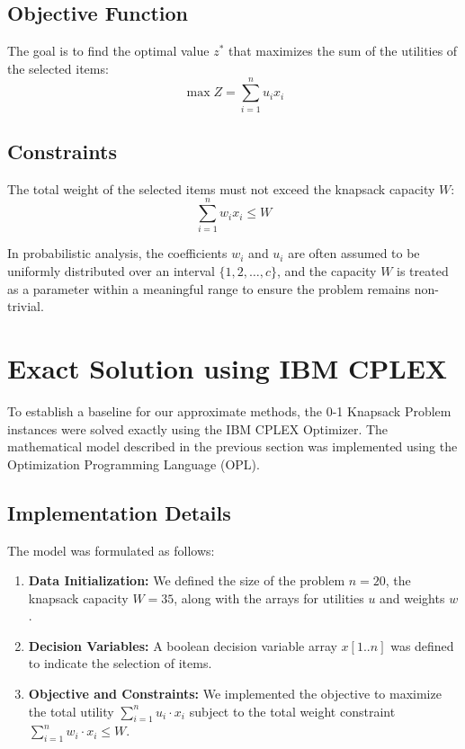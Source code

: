 \documentclass[11pt,a4paper]{article}
\begin{document}
\subsection*{Objective Function}
The goal is to find the optimal value $z^*$ that maximizes the sum of the utilities of the selected items:
\begin{equation*}
    \max Z = \sum_{i=1}^{n} u_i x_i
\end{equation*}

\subsection*{Constraints}
The total weight of the selected items must not exceed the knapsack capacity $W$:
\begin{equation*}
    \sum_{i=1}^{n} w_i x_i \le W
\end{equation*}

In probabilistic analysis, the coefficients $w_i$ and $u_i$ are often assumed to be uniformly distributed over an interval $\{1, 2, \dots, c\}$, and the capacity $W$ is treated as a parameter within a meaningful range to ensure the problem remains non-trivial.


\section{Exact Solution using IBM CPLEX}

To establish a baseline for our approximate methods, the 0-1 Knapsack Problem instances were solved exactly using the IBM CPLEX Optimizer. The mathematical model described in the previous section was implemented using the Optimization Programming Language (OPL).

\subsection*{Implementation Details}
The model was formulated as follows:
\begin{enumerate}
    \item \textbf{Data Initialization:} We defined the size of the problem $n = 20$, the knapsack capacity $W = 35$, along with the arrays for utilities $u$ and weights $w$.
    \item \textbf{Decision Variables:} A boolean decision variable array $x[1..n]$ was defined to indicate the selection of items.
    \item \textbf{Objective and Constraints:} We implemented the objective to maximize the total utility \(\sum_{i=1}^{n} u_i \cdot x_i\) subject to the total weight constraint \(\sum_{i=1}^{n} w_i \cdot x_i \le W\).
\end{enumerate}
\end{document}
